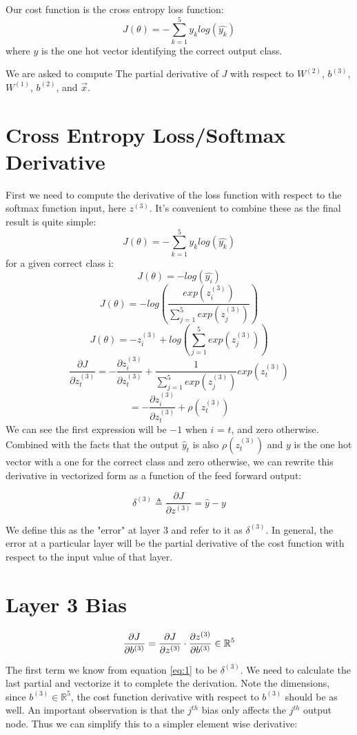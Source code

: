 \documentclass[]{article}
\newcommand{\deriv}[2]{%
	\ensuremath{\frac{\partial {#1}}{\partial {#2}}}}
\newcommand{\vlayer}[2]{ %
	\ensuremath{{#1}^{(#2)}}}
\newcommand{\reals}[1]{ %
	\ensuremath{\in \mathbb{R}^{#1}}}
\begin{document}
Our cost function is the cross entropy loss function:
$$J(\theta) = - \sum_{k=1}^{5} y_k log(\hat{y_k})$$
where $y$ is the one hot vector identifying the correct output class.

We are asked to compute The partial derivative of $J$ with respect to $W^{(2)}$, $b^{(3)}$, $W^{(1)}$, $b^{(2)}$, and $\vec{x}$.

\section{Cross Entropy Loss/Softmax Derivative}
First we need to compute the derivative of the loss function with respect to the softmax function input, here $z^{(3)}$. It's convenient to combine these as the final result is quite simple:
$$J(\theta) = - \sum_{k=1}^{5} y_k log(\hat{y_k})$$
for a given correct class i:
$$J(\theta) = - log(\hat{y_i})$$
$$J(\theta)= - log( \frac{exp(z^{(3)}_i)} {\sum_{j=1}^5 exp(z^{(3)}_j)} )$$
$$J(\theta)= -z^{(3)}_i + log({\sum_{j=1}^5 exp(z^{(3)}_j)})$$
$$\frac{\partial{J}}{\partial{z^{(3)}_t}} = -\frac{\partial{z^{(3)}_i}}{\partial{z^{(3)}_t}} + \frac{1}{\sum_{j=1}^5 exp(z^{(3)}_j)}exp(z^{(3)}_t)$$
$$ = -\frac{\partial{z^{(3)}_i}}{\partial{z^{(3)}_t}} + \rho(z^{(3)}_t)$$
We can see the first expression will be $-1$ when $i$ = $t$, and zero otherwise. Combined with the facts that the output $\hat y_t$ is also $\rho(z^{(3)}_t)$ and $y$ is the one hot vector with a one for the correct class and zero otherwise, we can rewrite this derivative in vectorized form as a function of the feed forward output:

\begin{equation} \label{eq:d3}
\delta^{(3)} \triangleq \frac{\partial{J}}{\partial{z^{(3)}}} = \hat y - y 
\end{equation}

We define this as the "error" at layer 3 and refer to it as $\delta^{(3)}$. In general, the error at a particular layer will be the partial derivative of the cost function with respect to the input value of that layer. 

\section{Layer 3 Bias}

$$ \deriv{J}{\vlayer{b}{3}} = \deriv{J}{\vlayer{z}{3}} \cdot \deriv{\vlayer{z}{3}}{\vlayer{b}{3}} \in \mathbb{R}^5$$

The first term we know from equation \ref{eq:1} to be $\delta^{(3)}$. We need to calculate the last partial and vectorize it to complete the derivation. Note the dimensions, since $b^{(3)} \reals{5}$, the cost function derivative with respect to\vlayer{b}{3} should be as well. An important observation is that the $j^{th}$ bias only affects the $j^{th}$ output node. Thus we can simplify this to a simpler element wise derivative:
\end{document}
